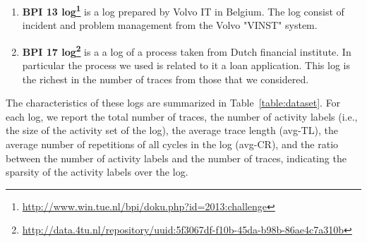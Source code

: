 \begin{enumerate}
	\item \textbf{BPI 13 log\footnote{\url{http://www.win.tue.nl/bpi/doku.php?id=2013:challenge}}} is a log prepared by Volvo IT in Belgium. The log consist of incident and problem management from the Volvo "VINST" system.   
	
	\item \textbf{BPI 17 log\footnote{\url{http://data.4tu.nl/repository/uuid:5f3067df-f10b-45da-b98b-86ae4c7a310b}}} is a a log of a process taken from Dutch financial institute. In particular the process we used is related to it a loan application. This log is the richest in the number of traces from those that we considered. 
		
	
\end{enumerate}

The characteristics of these logs are summarized in Table~\ref{table:dataset}. For each log, we report the total number of traces, the number of activity labels (i.e., the size of the activity set of the log), the average trace length (avg-TL), the average number of repetitions of all cycles in the log (avg-CR), and the ratio between the number of activity labels and the number of traces, indicating the sparsity of the activity labels over the log.



